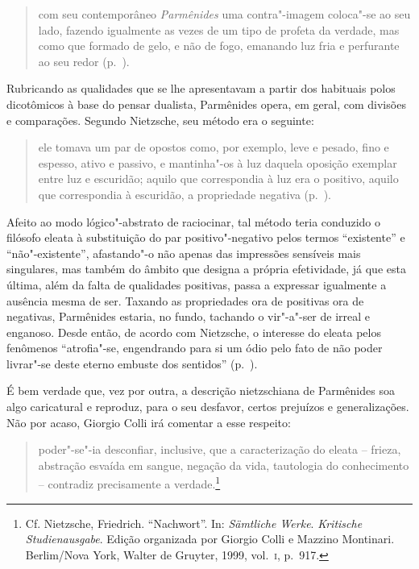 \begin{quote} 
com seu contemporâneo \textit{Parmênides} uma
 contra"-imagem coloca"-se ao seu lado, fazendo igualmente as vezes de um
 tipo de profeta da verdade, mas como que formado de gelo, e não de fogo,
 emanando luz fria e perfurante ao seu redor (p.~\pageref{comseucontemporaneo}).
\end{quote} 

Rubricando as qualidades que se lhe apresentavam a partir dos habituais polos
dicotômicos à base do pensar dualista, Parmênides opera, em geral, com
divisões e comparações. Segundo Nietzsche, seu método era o seguinte: 

\begin{quote} 
ele tomava um par de opostos como, por exemplo, leve e
 pesado, fino e espesso, ativo e passivo, e mantinha"-os à luz daquela
 oposição exemplar entre luz e escuridão; aquilo que correspondia à luz era o
 positivo, aquilo que correspondia à escuridão, a propriedade negativa
 (p.~\pageref{eletomavaumpar}).
\end{quote} 

Afeito ao modo lógico"-abstrato de raciocinar, tal método teria conduzido o
filósofo eleata à substituição do par positivo"-negativo pelos termos
``existente'' e ``não"-existente'', afastando"-o não apenas das impressões
sensíveis mais singulares, mas também do âmbito que designa a própria
efetividade, já que esta última, além da falta de qualidades positivas, passa
a expressar igualmente a ausência mesma de ser. Taxando as propriedades ora
de positivas ora de negativas, Parmênides estaria, no fundo, tachando o
vir"-a"-ser de irreal e enganoso. Desde então, de acordo com Nietzsche, o
interesse do eleata pelos fenômenos ``atrofia"-se, engendrando para si um
ódio pelo fato de não poder livrar"-se deste eterno embuste dos sentidos''
(p.~\pageref{odio}).

É bem verdade que, vez por outra, a descrição nietzschiana de Parmênides soa
algo caricatural e reproduz, para o seu desfavor, certos prejuízos e
generalizações. Não por acaso, Giorgio Colli irá comentar a esse respeito: 

\begin{quote} 
poder"-se"-ia desconfiar, inclusive, que a caracterização
 do	\label{colli} eleata -- frieza, abstração esvaída em sangue, negação da
 vida, tautologia do conhecimento -- contradiz precisamente a
 verdade.\footnote{ Cf. Nietzsche, Friedrich. ``Nachwort''. In:
\textit{Sämtliche Werke}. \textit{\mbox{Kritische} Studienausgabe}. Edição
 organizada por Giorgio Colli e Mazzino Montinari. Berlim/Nova York, Walter
 de Gruyter, 1999, vol.~\textsc{i}, p.~917.} 
\end{quote} 

